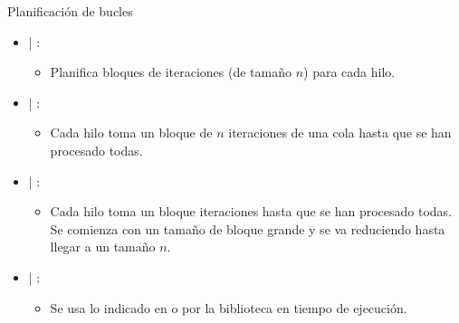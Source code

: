 \begin{frame}[t]{Planificación de bucles}
\begin{itemize}
  \item {} | :
    \begin{itemize}
      \item Planifica bloques de iteraciones (de tamaño $n$) para cada hilo.
    \end{itemize}
  
  \item {} | :
    \begin{itemize}
      \item Cada hilo toma un bloque de $n$ iteraciones de una cola hasta que se han procesado todas.
    \end{itemize}
  
  \item {} | :
    \begin{itemize}
      \item Cada hilo toma un bloque iteraciones hasta que se han procesado todas. Se 
            comienza con un tamaño de bloque grande y se va reduciendo hasta llegar a
            un tamaño $n$.
    \end{itemize}
  
  \item {} | :
    \begin{itemize}
      \item Se usa lo indicado en  o por la biblioteca
            en tiempo de ejecución.
    \end{itemize}
  
\end{itemize}
\end{frame}
